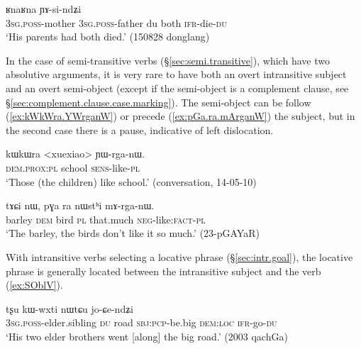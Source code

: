 \begin{exe}
	\ex \label{ex:RnaRna.YAsindZi}
	\gll [ɯ-mu ɯ-wa ni] ʁnaʁna ɲɤ-si-ndʑi \\
	\textsc{3sg}.\textsc{poss}-mother 	\textsc{3sg}.\textsc{poss}-father du both \textsc{ifr}-die-\textsc{du} \\ 
	\glt `His parents had both died.' (150828 donglang)
\end{exe}


In the case of semi-transitive verbs (§\ref{sec:semi.transitive}), which have two absolutive arguments, it is very rare to have both an overt intransitive subject and an overt semi-object (except if the semi-object is a complement clause, see §\ref{sec:complement.clause.case.marking}). The semi-object can be follow (\ref{ex:kWkWra.YWrganW}) or precede (\ref{ex:pGa.ra.mArganW}) the subject, but in the second case there is a pause, indicative of left dislocation.

\begin{exe}
\ex \label{ex:kWkWra.YWrganW}
\gll kɯkɯra <xuexiao> ɲɯ-rga-nɯ. \\
\textsc{dem}.\textsc{prox}:\textsc{pl} school \textsc{sens}-like-\textsc{pl} \\
\glt `Those (the children) like school.' (conversation, 14-05-10)
\end{exe}

\begin{exe}
\ex \label{ex:pGa.ra.mArganW}
\gll  tɤɕi nɯ, pɣa ra nɯstʰi mɤ-rga-nɯ. \\
barley \textsc{dem} bird \textsc{pl} that.much \textsc{neg}-like:\textsc{fact}-\textsc{pl} \\
\glt `The barley, the birds don't like it so much.' (23-pGAYaR)
\end{exe}

 With intransitive verbs selecting a locative phrase (§\ref{sec:intr.goal}), the locative phrase is generally located between the intransitive subject and the verb (\ref{ex:SOblV}). 

\begin{exe}
\ex \label{ex:SOblV}
\gll [ɯ-pi ni] tʂu kɯ-wxti nɯtɕu jo-ɕe-ndʑi \\
\textsc{3sg}.\textsc{poss}-elder.sibling \textsc{du} road \textsc{sbj}:\textsc{pcp}-be.big \textsc{dem}:\textsc{loc} \textsc{ifr}-go-\textsc{du} \\
\glt `His two elder brothers went [along] the big road.' (2003 qachGa)
\end{exe}

